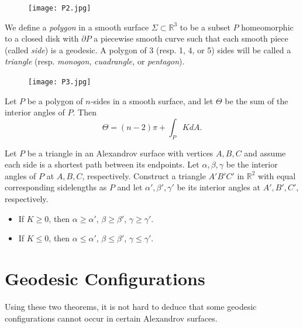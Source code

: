 \documentclass[oneside,a4paper]{amsart}
\begin{document}
\begin{figure}[h]
\begin{center}
\texttt{[image: P2.jpg]}\\
\end{center}
\end{figure}

We define a \textit{polygon} in a smooth surface $\Sigma \subset \mathbb{R}^3$ to be a subset $P$ homeomorphic to a closed disk with $\partial P$ a piecewise smooth curve such that each smooth piece (called \textit{side}) is a geodesic. A polygon of 3 (resp. 1, 4, or 5) sides will be called a \textit{triangle} (resp. \textit{monogon}, \textit{cuadrangle,} or \textit{pentagon}).


\begin{figure}[h]
\begin{center}
\texttt{[image: P3.jpg]}\\
\end{center}
\end{figure}


\begin{thm}\label{B}
Let $P$ be a polygon of $n$-sides in a smooth surface, and let $\Theta$ be the sum of the interior angles of $P$. Then
$$  \Theta = (n-2) \pi + \int_P K dA. $$
\end{thm}

\begin{thm}\label{C}
Let $P$ be a triangle in an Alexandrov surface with vertices $A, B, C$ and assume each side is a shortest path between its endpoints. Let $\alpha , \beta , \gamma$ be the interior angles of $P$ at $A,B,C$, respectively. Construct a triangle $A'B'C'$ in $\mathbb{R}^2$ with equal corresponding sidelengths as $P$ and let $\alpha ' ,\beta ' , \gamma ' $ be its interior angles at $A' , B'  , C' $, respectively.
\begin{itemize}
\item If $K \geq 0$, then $\alpha \geq \alpha '$, $\beta \geq \beta '$, $\gamma \geq \gamma '$.
\item If $K \leq 0$, then $\alpha \leq \alpha '$, $\beta \leq \beta '$, $\gamma \leq \gamma '$.
\end{itemize}
\end{thm}

\section*{Geodesic Configurations}

Using these two theorems, it is not hard to deduce that some geodesic configurations cannot occur in certain Alexandrov surfaces.
\end{document}
